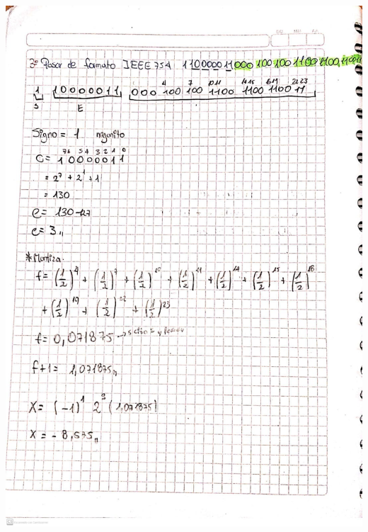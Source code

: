 \documentclass[12pt]{article}
\begin{document}
\begin{itemize}
\begin{minipage}{0.95\textwidth}
    \raggedleft
    \includegraphics[width=1.15\textwidth]{inFiles/Figures/ejer3.jpeg}
\end{minipage}
\vspace{0.5cm}



\end{itemize}
\end{document}
